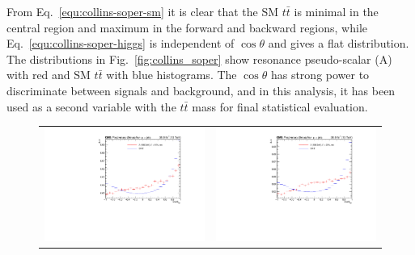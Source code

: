 From Eq.~\ref{equ:collins-soper-sm} it is clear that the SM $t\bar t$ is minimal in the central region and maximum in the forward and backward regions, while Eq.~\ref{equ:collins-soper-higgs} is independent of $\cos\theta$ and gives a flat distribution. The distributions in Fig.~\ref{fig:collins_soper} show resonance pseudo-scalar (A) with red and SM $t\bar t$ with blue histograms. The $\cos\theta$ has strong power to discriminate between signals and background, and in this analysis, it has been used as a second variable with the $t \bar t$ mass for final statistical evaluation.  
\begin{figure}[htp]
\centering
\begin{tabular}{cc}
\hspace{-0.3cm}
\includegraphics[scale=0.45]{fig/sm_beyond/cos_theta_pseudoscalar_M400_RelW10_res.pdf}
& \hspace{-2.cm} \includegraphics[scale=0.45]{fig/sm_beyond/cos_theta_pseudoscalar_M500_RelW25_res.pdf}\\

\end{tabular}
\end{figure}
